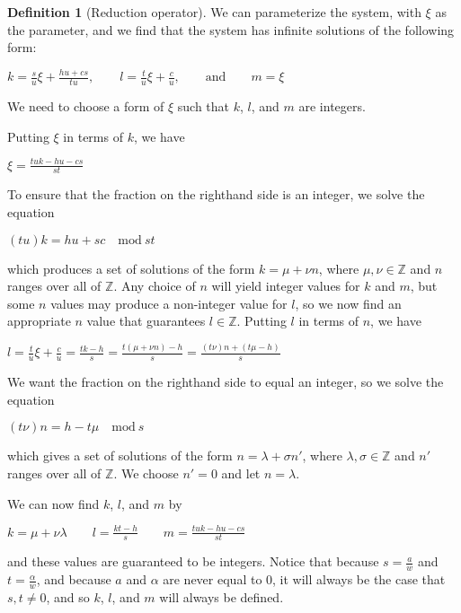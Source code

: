 \documentclass{article}
\theoremstyle{definition}
\newtheorem{definition}{Definition}[section]
\theoremstyle{theorem}
\theoremstyle{example}
\theoremstyle{corollary}
\begin{document}
\begin{definition}[Reduction operator]
\bigskip

We can parameterize the system, with \(\xi\) as the parameter, and we find that the system has infinite solutions of the following form:
\begin{center}
\(k = \frac{s}{u} \xi + \frac{hu + cs}{tu}, \quad \quad l = \frac{t}{u} \xi + \frac{c}{u}, \quad \quad \textrm{and} \quad \quad m = \xi\)
\end{center}

\bigskip

We need to choose a form of \(\xi\) such that \(k\), \(l\), and \(m\) are integers.

\bigskip

Putting \(\xi\) in terms of \(k\), we have
\begin{center}
\(\xi = \frac{tuk - hu - cs}{st}\)
\end{center}

\bigskip

To ensure that the fraction on the righthand side is an integer, we solve the equation
\begin{center}
\((tu)k = hu + sc \quad \textrm{mod} \ st\)
\end{center}
which produces a set of solutions of the form \(k = \mu + \nu n\), where \(\mu, \nu \in \mathbb{Z}\) and \(n\) ranges over all of \(\mathbb{Z}\). Any choice of \(n\) will yield integer values for \(k\) and \(m\), but some \(n\) values may produce a non-integer value for \(l\), so we now find an appropriate \(n\) value that guarantees \(l \in \mathbb{Z}\). Putting \(l\) in terms of \(n\), we have
\begin{center}
\(l = \frac{t}{u} \xi + \frac{c}{u} = \frac{tk - h}{s} = \frac{t(\mu + \nu n) - h}{s} = \frac{(t\nu)n + (t\mu - h)}{s}\)
\end{center}

\bigskip

We want the fraction on the righthand side to equal an integer, so we solve the equation
\begin{center}
\((t\nu)n = h - t\mu \quad \textrm{mod} \ s\)
\end{center}
which gives a set of solutions of the form \(n = \lambda + \sigma n'\), where \(\lambda, \sigma \in \mathbb{Z}\) and \(n'\) ranges over all of \(\mathbb{Z}\). We choose \(n' = 0\) and let \(n = \lambda\).

\bigskip

We can now find \(k\), \(l\), and \(m\) by
\begin{center}
\(k = \mu + \nu \lambda \quad \quad l = \frac{kt - h}{s} \quad \quad m = \frac{tuk - hu - cs}{st}\)
\end{center}
and these values are guaranteed to be integers. Notice that because \(s = \frac{a}{w}\) and \(t = \frac{\alpha}{w}\), and because \(a\) and \(\alpha\) are never equal to \(0\), it will always be the case that \(s, t \ne 0\), and so \(k\), \(l\), and \(m\) will always be defined.


\end{definition}
\end{document}
